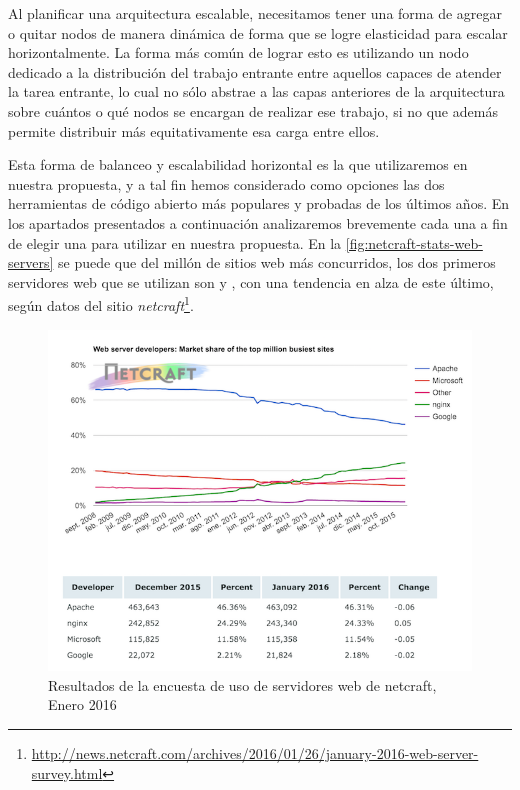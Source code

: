 Al planificar una arquitectura escalable, necesitamos tener una forma de agregar o quitar nodos de manera dinámica de forma que se logre elasticidad para escalar horizontalmente. La forma más común de lograr esto es utilizando un nodo dedicado a la distribución del trabajo entrante entre aquellos capaces de atender la tarea entrante, lo cual no sólo abstrae a las capas anteriores de la arquitectura sobre cuántos o qué nodos se encargan de realizar ese trabajo, si no que además permite distribuir más equitativamente esa carga entre ellos.

Esta forma de balanceo y escalabilidad horizontal es la que utilizaremos en nuestra propuesta, y a tal fin hemos considerado como opciones las dos herramientas de código abierto más populares y probadas de los últimos años. En los apartados presentados a continuación analizaremos brevemente cada una a fin de elegir una para utilizar en nuestra propuesta. En la \autoref{fig:netcraft-stats-web-servers} se puede que del millón de sitios web más concurridos, los dos primeros servidores web que se utilizan son  y , con una tendencia en alza de este último, según datos del sitio \textit{netcraft}\footnote{\url{http://news.netcraft.com/archives/2016/01/26/january-2016-web-server-survey.html}}.

\begin{figure}[H]
  \includegraphics[width=\linewidth]{src/images/03-capitulo-3/tecnologias/balanceo/stats.png}
  \caption{Resultados de la encuesta de uso de servidores web de netcraft, Enero 2016}
  \label{fig:netcraft-stats-web-servers}
\end{figure}
